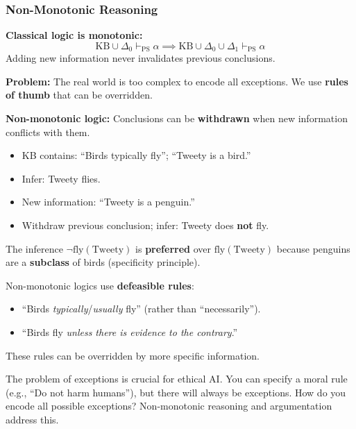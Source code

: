 \bigseparator

\subsubsection{Non-Monotonic Reasoning}

\begin{defbox}
\textbf{Classical logic is monotonic:}
\[
\text{KB} \cup \Delta_0 \vdash_{\text{PS}} \alpha \implies \text{KB} \cup \Delta_0 \cup \Delta_1 \vdash_{\text{PS}} \alpha
\]
Adding new information never invalidates previous conclusions.

\textbf{Problem:} The real world is too complex to encode all exceptions. We use \textbf{rules of thumb} that can be overridden.

\textbf{Non-monotonic logic:} Conclusions can be \textbf{withdrawn} when new information conflicts with them.
\end{defbox}

\begin{exbox}
\begin{itemize}
  \item KB contains: ``Birds typically fly''; ``Tweety is a bird.''
  \item Infer: Tweety flies.
  \item New information: ``Tweety is a penguin.''
  \item Withdraw previous conclusion; infer: Tweety does \textbf{not} fly.
\end{itemize}

The inference $\neg\text{fly}(\text{Tweety})$ is \textbf{preferred} over $\text{fly}(\text{Tweety})$ because penguins are a \textbf{subclass} of birds (specificity principle).
\end{exbox}

\begin{defbox}
Non-monotonic logics use \textbf{defeasible rules}:
\begin{itemize}
  \item ``Birds \textit{typically}/\textit{usually} fly'' (rather than ``necessarily'').
  \item ``Birds fly \textit{unless there is evidence to the contrary}.''
\end{itemize}
These rules can be overridden by more specific information.
\end{defbox}

\begin{tipbox}
The problem of exceptions is crucial for ethical AI. You can specify a moral rule (e.g., ``Do not harm humans''), but there will always be exceptions. How do you encode all possible exceptions? Non-monotonic reasoning and argumentation address this.
\end{tipbox}

